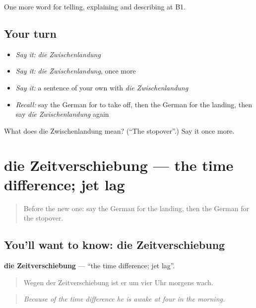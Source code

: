 \begin{grammarlens}[title={What you've built}]
One more word for telling, explaining and describing at B1.
\end{grammarlens}

\subsection*{Your turn}
\begin{itemize}
\raggedright
  \item \emph{Say it:} \emph{die Zwischenlandung}
  \item \emph{Say it:} \emph{die Zwischenlandung}, once more
  \item \emph{Say it:} a sentence of your own with \emph{die Zwischenlandung}
  \item \emph{Recall:} say the German for to take off, then the German for the landing, then say \emph{die Zwischenlandung} again
\end{itemize}

\begin{tcolorbox}[breakable,colback=teal!4,colframe=teal!35!black,title={Before you move on}]
What does die Zwischenlandung mean? (\textquotedblleft{}The stopover\textquotedblright{}.) Say it once more.
\end{tcolorbox}
\section[die Zeitverschiebung]{die Zeitverschiebung — the time difference; jet lag}

\label{lesson:GE-C419-zeitverschiebung}



\begin{quote}
Before the new one: say the German for the landing, then the German for the stopover.
\end{quote}

\subsection*{You'll want to know: die Zeitverschiebung}
\textbf{die Zeitverschiebung} — \textquotedblleft{}the time difference; jet lag\textquotedblright{}.

\begin{quote}
Wegen der Zeitverschiebung ist er um vier Uhr morgens wach.
\end{quote}

\begin{quote}
\emph{Because of the time difference he is awake at four in the morning.}
\end{quote}

